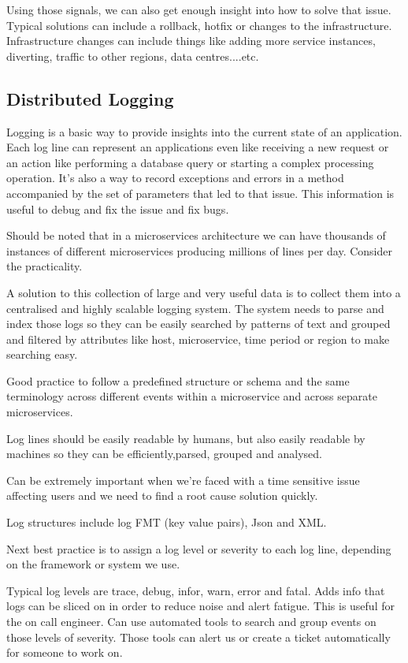Using those signals, we can also get enough insight into how to solve that issue.
Typical solutions can include a rollback, hotfix or changes to the infrastructure.
Infrastructure changes can include things like adding more service instances, diverting, traffic to other regions, data centres....etc.

\subsection{Distributed Logging}

Logging is a basic way to provide insights into the current state of an application.
Each log line can represent an applications even like receiving a new request or an action like performing a database query or starting a complex processing operation.
It's also a way to record exceptions and errors in a method accompanied by the set of parameters that led to that issue.
This information is useful to debug and fix the issue and fix bugs.

Should be noted that in a microservices architecture we can have thousands of instances of different microservices producing millions of lines per day.
Consider the practicality.

A solution to this collection of large and very useful data is to collect them into a centralised and highly scalable logging system.
The system needs to parse and index those logs so they can be easily searched by patterns of text and grouped and filtered by attributes like host, microservice, time period or region to make searching easy.

Good practice to follow a predefined structure or schema and the same terminology across different events within a microservice and across separate microservices.

Log lines should be easily readable by humans, but also easily readable by machines so they can be efficiently,parsed, grouped and analysed.

Can be extremely important when we're faced with a time sensitive issue affecting users and we need to find a root cause solution quickly.

Log structures include log FMT (key value pairs), Json and XML.

Next best practice is to assign a log level or severity to each log line, depending on the framework or system we use.

Typical log levels are trace, debug, infor, warn, error and fatal.
Adds info that logs can be sliced on in order to reduce noise and alert fatigue.
This is useful for the on call engineer.
Can use automated tools to search and group events on those levels of severity.
Those tools can alert us or create a ticket automatically for someone to work on.

